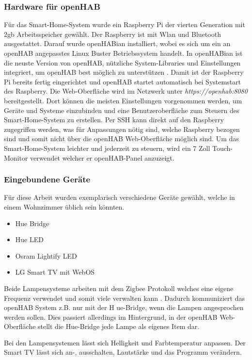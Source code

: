 	\subsubsection{Hardware für openHAB}
		Für das Smart-Home-System wurde ein Raspberry Pi der vierten Generation mit 2gb Arbeitsspeicher gewählt. Der Raspberry ist mit Wlan und Bluetooth ausgestattet. Darauf wurde openHABian installiert, wobei es sich um ein an openHAB angepasstes Linux Buster Betriebssystem handelt. In openHABian ist die neuste Version von openHAB, nützliche System-Libraries und Einstellungen integriert, um openHAB best möglich zu unterstützen \cite{DB:openhabian}. Damit ist der Raspberry Pi bereits fertig eingerichtet und openHAB startet automatisch bei Systemstart des Raspberry. Die Web-Oberfläche wird im Netzwerk unter \textit{https://openhab:8080} bereitgestellt. Dort können die meisten Einstellungen vorgenommen werden, um Geräte und Systeme einzubinden und eine Benutzeroberfläche zum Steuern des Smart-Home-System zu erstellen. Per SSH kann direkt auf den Raspberry zugegriffen werden, was für Anpassungen nötig sind, welche Raspberry bezogen sind und somit nicht über die openHAB Web-Oberfläche möglich sind.
		Um das Smart-Home-System leichter und jederzeit zu steuern, wird ein 7 Zoll Touch-Monitor verwendet welcher er openHAB-Panel anzuzeigt.
		
	\subsubsection{Eingebundene Geräte}
		Für diese Arbeit wurden exemplarisch verschiedene Geräte gewählt, welche in einem Wohnzimmer üblich sein könnten.
		\begin{itemize}
			\item Hue Bridge
			\item Hue LED
			\item Osram Lightify LED
			\item LG Smart TV mit WebOS
		\end{itemize}
		Beide Lampensysteme arbeiten mit dem Zigbee Protokoll welches eine eigene Frequenz verwendet und somit viele verwalten kann \cite{DB:zigbee}. Dadurch kommuniziert das openHAB System z.B. nur mit der H ue-Bridge, wenn die Lampen angesprochen werden sollen. Dies passiert allerdings im Hintergrund, in der openHAB Web-Oberfläche stellt die Hue-Bridge jede Lampe als eigenes Item dar.
		
		Bei den Lampensystemen lässt sich Helligkeit und Farbtemperatur anpassen. Der Smart TV lässt sich an-, ausschalten, Lautstärke und das Programm verändern.
		
